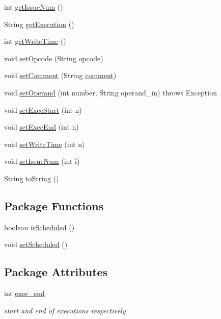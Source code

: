 \begin{DoxyCompactItemize}
\item 
int \hyperlink{classOperation_a5accacc3ce8e2653bd3b65ddef058670}{get\-Issue\-Num} ()
\item 
\-String \hyperlink{classOperation_aabe96409ea6c517e07c07277a9bd6be6}{get\-Execution} ()
\item 
int \hyperlink{classOperation_ad8b1f145050d381688535a3311d48143}{get\-Write\-Time} ()
\item 
void \hyperlink{classOperation_ac8493946ebb2ff362b7a9826c515aef4}{set\-Opcode} (\-String \hyperlink{classOperation_a91a69611ab1dd4ca12de1abdd49c2b42}{opcode})
\item 
void \hyperlink{classOperation_a4bb7b2db5560ac84940f305207b31404}{set\-Comment} (\-String \hyperlink{classOperation_a3b56588030b54deb7ffb0c5f0a4ebe68}{comment})
\item 
void \hyperlink{classOperation_af84aceab243ad1c694e749b83a233d1a}{set\-Operand} (int number, \-String operand\-\_\-in)  throws Exception
\item 
void \hyperlink{classOperation_a47af41a9f8ee13b0038fe6de3c96c804}{set\-Exec\-Start} (int n)
\item 
void \hyperlink{classOperation_ac0b7d71ca5cc03ed25fa7c069b6c4ea1}{set\-Exec\-End} (int n)
\item 
void \hyperlink{classOperation_ab5c62892336b30cec49b36dd01503def}{set\-Write\-Time} (int n)
\item 
void \hyperlink{classOperation_a333309bc371302cdbfab142cd9775032}{set\-Issue\-Num} (int i)
\item 
\-String \hyperlink{classOperation_a14f47977fe6f954977bbe1fc558c7174}{to\-String} ()
\end{DoxyCompactItemize}
\subsection*{\-Package \-Functions}
\begin{DoxyCompactItemize}
\item 
boolean \hyperlink{classOperation_a78754fb1285604d5802ecd482386eb24}{is\-Scheduled} ()
\item 
void \hyperlink{classOperation_a8267763b76c5e32c4cc748db3d2df27e}{set\-Scheduled} ()
\end{DoxyCompactItemize}
\subsection*{\-Package \-Attributes}
\begin{DoxyCompactItemize}
\item 
int \hyperlink{classOperation_aaea255d6ed7bf51b531179aa87cb5b6d}{exec\-\_\-end}
\begin{DoxyCompactList}\small\item\em start and end of executions respectively \end{DoxyCompactList}\end{DoxyCompactItemize}
